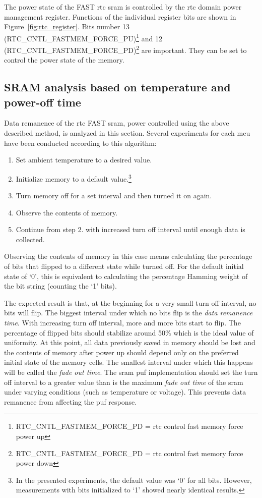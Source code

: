 The power state of the FAST \gls{rtc} \gls{sram} is controlled by the \gls{rtc} domain power management register. Functions of the individual register bits are shown in Figure~\ref{fig:rtc_register}. Bits number 13 (RTC\_CNTL\_FASTMEM\_FORCE\_PU)\footnote{RTC\_CNTL\_FASTMEM\_FORCE\_PD = \gls{rtc} control fast memory force power up} and 12 (RTC\_CNTL\_FASTMEM\_FORCE\_PD)\footnote{RTC\_CNTL\_FASTMEM\_FORCE\_PD = \gls{rtc} control fast memory force power down} are important. They can be set to control the power state of the memory.\cite{esp322021}

\subsection{SRAM analysis based on temperature and power-off time}\label{sec:rtc_analysis}

Data remanence of the \gls{rtc} FAST \gls{sram}, power controlled using the above described method, is analyzed in this section. Several experiments for each \gls{mcu} have been conducted according to this algorithm:

\begin{enumerate}
    \item Set ambient temperature to a desired value.
    \item Initialize memory to a default value.\footnote{In the presented experiments, the default value was `0' for all bits. However, measurements with bits initialized to `1' showed nearly identical results.}
    \item Turn memory off for a set interval and then turned it on again.
    \item Observe the contents of memory.
    \item Continue from step 2. with increased turn off interval until enough data is collected.
\end{enumerate}

Observing the contents of memory in this case means calculating the percentage of bits that flipped to a different state while turned off. For the default initial state of `0', this is equivalent to calculating the percentage Hamming weight of the bit string (counting the `1' bits).

The expected result is that, at the beginning for a very small turn off interval, no bits will flip. The biggest interval under which no bits flip is the \emph{data remanence time}. With increasing turn off interval, more and more bits start to flip. The percentage of flipped bits should stabilize around 50\% which is the ideal value of uniformity. At this point, all data previously saved in memory should be lost and the contents of memory after power up should depend only on the preferred initial state of the memory cells. The smallest interval under which this happens will be called the \emph{fade out time}. The \gls{sram} \gls{puf} implementation should set the turn off interval to a greater value than is the maximum \emph{fade out time} of the \gls{sram} under varying conditions (such as temperature or voltage). This prevents data remanence from affecting the \gls{puf} response.

